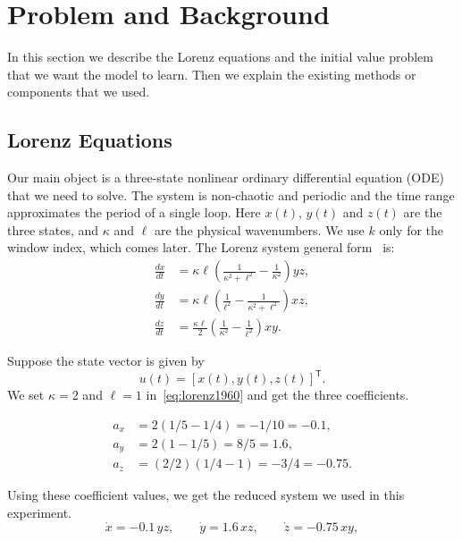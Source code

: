 \documentclass[conference,a4paper]{IEEEtran}
\begin{document}
\section{Problem and Background}
In this section we describe the Lorenz equations and the initial value problem that we want the model to learn. Then we explain the existing methods or components that we used.

\subsection{Lorenz Equations}
Our main object is a three-state nonlinear ordinary differential equation (ODE) that we need to solve. The system is non-chaotic and periodic and the time range approximates the period of a single loop.  Here $x(t)$, $y(t)$ and $z(t)$ are the three states, and $\kappa$ and $\ell$ are the physical wavenumbers. We use $k$ only for the window index, which comes later. The Lorenz system general form~\cite{lorenz1960} is:
\begin{equation}
\begin{aligned}
\frac{dx}{dt}
  &= \kappa\ell
     \left(\frac{1}{\kappa^2+\ell^2}
           -\frac{1}{\kappa^2}\right)yz,\\
\frac{dy}{dt}
  &= \kappa\ell
     \left(\frac{1}{\ell^2}
           -\frac{1}{\kappa^2+\ell^2}\right)xz,\\
\frac{dz}{dt}
  &= \frac{\kappa\ell}{2}
     \left(\frac{1}{\kappa^2}
           -\frac{1}{\ell^2}\right)xy.
\end{aligned}
\label{eq:lorenz1960}
\end{equation}

Suppose the state vector is given by
\[
u(t)=[x(t),y(t),z(t)]^\mathsf{T}.
\]
 We set $\kappa=2$ and $\ell=1$ in~\eqref{eq:lorenz1960} and get the three coefficients.


\[
\begin{aligned}
a_x&=2(1/5-1/4)=-1/10=-0.1,\\
a_y&=2(1-1/5)=8/5=1.6,\\
a_z&=(2/2)(1/4-1)=-3/4=-0.75.
\end{aligned}
\]

Using these coefficient values, we get the reduced system we used in this experiment.
\begin{equation}
\dot{x}=-0.1\,yz,\qquad \dot{y}=1.6\,xz,\qquad \dot{z}=-0.75\,xy,
\label{eq:ode}
\end{equation}
\end{document}
